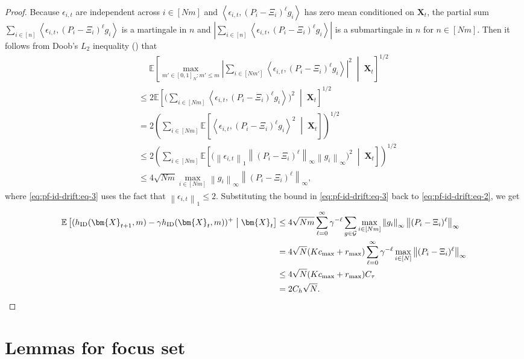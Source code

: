 \documentclass{article}
\theoremstyle{plain}
\theoremstyle{remark}
\newcommand{\norm}[1]{\left\lVert#1\right\rVert}
\newcommand{\E}[1]{\mathbb{E}\left[#1\right]}
\newcommand{\givenmiddle}{\;\middle|\;}
\newcommand{\abs}[1]{\left\lvert#1\right\rvert}
\newcommand{\sumell}{\sum_{\ell=0}^\infty}
\newcommand{\maxmp}{\max_{m'\in[0,1]_N\colon m'\leq m}}
\newcommand{\Ctau}{C_\tau}
\newcommand{\ID}{\textnormal{ID}}
\def\mX{{\bm{X}}}
\newcommand{\EE}{\mathbb{E}}
\newcommand{\innerproduct}[2]{\left\langle #1, #2 \right\rangle}
\newcommand{\mbracket}[1]{\left[#1\right]}
\begin{document}
\begin{proof}
    Because $\epsilon_{i,t}$ are independent across $i\in [Nm]$ and   $\innerproduct{\epsilon_{i,t}}{(P_i-\Xi_i)^{\ell}g_i}$ has zero mean conditioned on $\mX_t$, the partial sum $\sum_{i\in[n]} \innerproduct{\epsilon_{i,t}}{(P_i-\Xi_i)^{\ell}g_i}$ is a martingale in $n$ and $\abs{\sum_{i\in[n]} \innerproduct{\epsilon_{i,t}}{(P_i-\Xi_i)^{\ell}g_i}}$ is a submartingale in $n$ for $n\in [Nm]$. Then it follows from Doob's $L_2$ inequality (\citealp[Theorem 5.4.3]{Dur_19_prob_book}) that
    \begin{align}
        \nonumber
        &\mspace{23mu} \E{ \maxmp \abs{\sum_{i\in[Nm']} \innerproduct{\epsilon_{i,t}}{(P_i-\Xi_i)^{\ell}g_i}}^2 \givenmiddle \mX_t}^{1/2}  \\
        \nonumber
        &\leq 2 \E{ \bigg( \sum_{i\in[Nm]} \innerproduct{\epsilon_{i,t}}{(P_i-\Xi_i)^{\ell}g_i} \bigg)^2 \givenmiddle \mX_t}^{1/2} \\
        \nonumber
        &= 2  \left( \sum_{i\in[Nm]} \E{ \innerproduct{\epsilon_{i,t}}{(P_i-\Xi_i)^{\ell}g_i}^2 \givenmiddle \mX_t}\right)^{1/2} \\
        \nonumber
        &\leq  2 \left(\sum_{i\in [Nm]}\E{\Big(\norm{\epsilon_{i,t}}_1 \norm{(P_i-\Xi_i)^{\ell}}_\infty \norm{g_i}_\infty\Big)^2 \givenmiddle \mX_t}\right)^{1/2} \\
        \label{eq:pf-id-drift:eq-3}
        &\leq 4 \sqrt{Nm} \max_{i\in [Nm]} \norm{g_i}_{\infty}\norm{(P_i-\Xi_i)^{\ell}}_{\infty},
    \end{align}
    where \eqref{eq:pf-id-drift:eq-3} uses the fact that $\norm{\epsilon_{i,t}}_1 \leq 2$. 
    Substituting the bound in \eqref{eq:pf-id-drift:eq-3} back to \eqref{eq:pf-id-drift:eq-2}, we get 
    \begin{align*}
        \EE\mbracket{(h_{\ID}(\mX_{t+1},m)-\gamma h_{\ID}(\mX_{t},m))^+\givenmiddle\mX_t}
        &\leq  4 \sqrt{Nm}  \sumell \gamma^{-\ell} \sum_{g\in \mathcal{G}}\max_{i\in [Nm]} \norm{g_i}_{\infty}\norm{(P_i-\Xi_i)^{\ell}}_{\infty} \\
        &= 4 \sqrt{N}   (K c_{\max} + r_{\max})\sumell \gamma^{-\ell}\max_{i\in [N]}\norm{(P_i-\Xi_i)^{\ell}}_{\infty} \\
        \nonumber
        &\leq 4\sqrt{N} (Kc_{\max} + r_{\max}) \Ctau \\
        &= 2C_h\sqrt{N}.  \qedhere
    \end{align*}
\end{proof}



\section{Lemmas for focus set}
\label{sec:lem-proof-focus-set}
\end{document}
